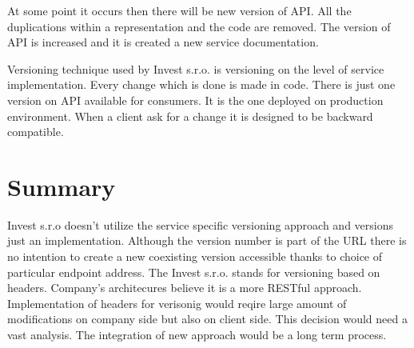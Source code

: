 At some point it occurs then there will be new version of API. All the duplications within a representation and the code are removed. The version of API is increased and it is created a new service documentation.

Versioning technique used by Invest s.r.o. is versioning on the level of service implementation. Every change which is done is made in code. There is just one version on API available for consumers. It is the one deployed on production environment. When a client ask for a change it is designed to be backward compatible.


\section{Summary}
Invest s.r.o doesn't utilize the service specific versioning approach and versions just an implementation. Although the version number is part of the URL there is no intention to create a new coexisting version accessible thanks to choice of particular endpoint address.
The Invest s.r.o. stands for versioning based on headers. Company's architecures believe it is a more RESTful approach. Implementation of headers for verisonig would reqire large amount of modifications on company side but also on client side. This decision would need a vast analysis. The integration of new approach would be a long term process. 







